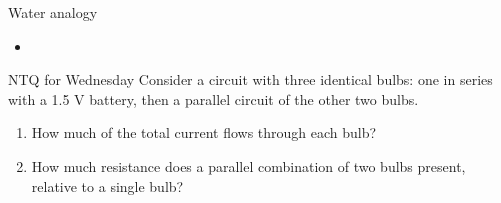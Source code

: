 \documentclass[english]{beamer}
\begin{document}
\begin{frame}{Water analogy}
  \begin{itemize}
    \item 
  \end{itemize}
\end{frame}

\begin{frame}{NTQ for Wednesday}
  Consider a circuit with three identical bulbs: one in series with a 1.5 V battery, then a parallel circuit of the other two bulbs. 
  \begin{enumerate}
    \item How much of the total current flows through each bulb? 
    \item How much resistance does a parallel combination of two bulbs present, relative to a single bulb?
  \end{enumerate}
\end{frame}
\end{document}

